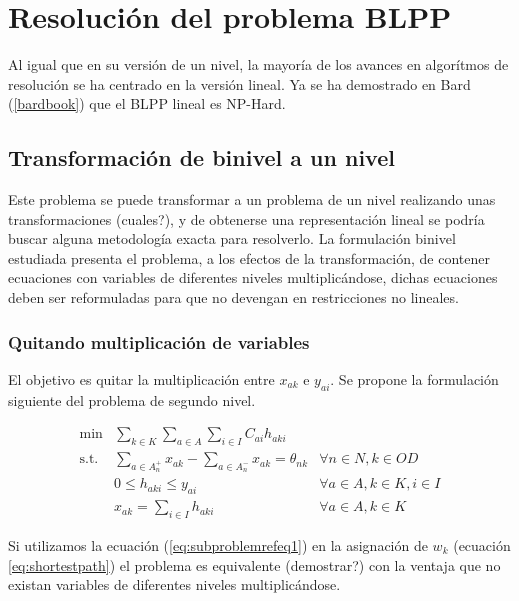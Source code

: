\documentclass{article}
\begin{document}
  \section*{Resolución del problema BLPP}

  Al igual que en su versión de un nivel, la mayoría de los avances en algorítmos de resolución se ha centrado en la versión lineal. Ya se ha demostrado en Bard (\ref{bardbook}) que el BLPP lineal es NP-Hard.

  \subsection*{Transformación de binivel a un nivel}

  Este problema se puede transformar a un problema de un nivel realizando unas transformaciones (cuales?), y de obtenerse una representación lineal se podría buscar alguna metodología exacta para resolverlo. La formulación binivel estudiada presenta el problema, a los efectos de la transformación, de contener ecuaciones con variables de diferentes niveles multiplicándose, dichas ecuaciones deben ser reformuladas para que no devengan en restricciones no lineales.

  \subsubsection*{Quitando multiplicación de variables}

  El objetivo es quitar la multiplicación entre $x_{ak}$ e $y_{ai}$. Se propone la formulación siguiente del problema de segundo nivel.

  \begin{align}
    \text{min}  & \sum_{k \in K} \sum_{a \in A} \sum_{i \in I} C_{ai} h_{aki}         & \label{eq:subproblemrefeq1} \\
    \text{s.t.} & \sum_{a \in A_n^+} x_{ak} - \sum_{a \in A_n^-} x_{ak} = \theta_{nk} & \forall n \in N, k \in OD \\
                & 0 \leq h_{aki} \leq y_{ai}                                          & \forall a \in A, k \in K, i \in I \\
                & x_{ak} = \sum_{i \in I} h_{aki}                                     & \forall a \in A, k \in K
  \end{align}

  Si utilizamos la ecuación (\ref{eq:subproblemrefeq1}) en la asignación de $w_k$ (ecuación \ref{eq:shortestpath}) el problema es equivalente (demostrar?) con la ventaja que no existan variables de diferentes niveles multiplicándose.
\end{document}
